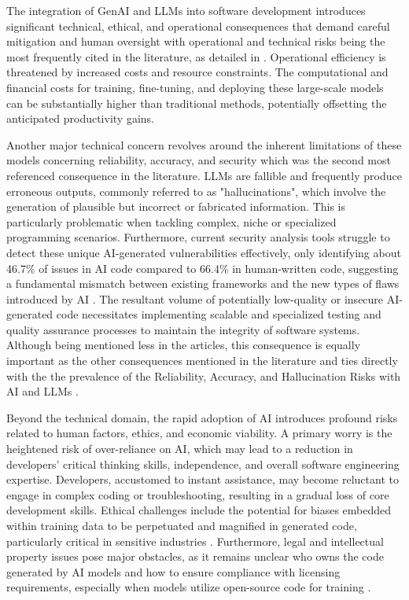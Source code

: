 The integration of GenAI and LLMs into software development introduces significant technical, ethical, and operational consequences that demand careful mitigation and human oversight with operational and technical risks being the most frequently cited in the literature, as detailed in . Operational efficiency is threatened by increased costs and resource constraints. The computational and financial costs for training, fine-tuning, and deploying these large-scale models can be substantially higher than traditional methods, potentially offsetting the anticipated productivity gains. 

Another major technical concern revolves around the inherent limitations of these models concerning reliability, accuracy, and security which was the second most referenced consequence in the literature. LLMs are fallible and frequently produce erroneous outputs, commonly referred to as "hallucinations", which involve the generation of plausible but incorrect or fabricated information. This is particularly problematic when tackling complex, niche or specialized programming scenarios. Furthermore, current security analysis tools struggle to detect these unique AI-generated vulnerabilities effectively, only identifying about 46.7\% of issues in AI code compared to 66.4\% in human-written code, suggesting a fundamental mismatch between existing frameworks and the new types of flaws introduced by AI \cite{Yoo:2025sa}. The resultant volume of potentially low-quality or insecure AI-generated code necessitates implementing scalable and specialized testing and quality assurance processes to maintain the integrity of software systems. Although being mentioned less in the articles, this consequence is equally important as the other consequences mentioned in the literature and ties directly with the the prevalence of the Reliability, Accuracy, and Hallucination Risks with AI and LLMs . 

Beyond the technical domain, the rapid adoption of AI introduces profound risks related to human factors, ethics, and economic viability. A primary worry is the heightened risk of over-reliance on AI, which may lead to a reduction in developers' critical thinking skills, independence, and overall software engineering expertise. Developers, accustomed to instant assistance, may become reluctant to engage in complex coding or troubleshooting, resulting in a gradual loss of core development skills. Ethical challenges include the potential for biases embedded within training data to be perpetuated and magnified in generated code, particularly critical in sensitive industries \cite{Haque:2025la}. Furthermore, legal and intellectual property issues pose major obstacles, as it remains unclear who owns the code generated by AI models and how to ensure compliance with licensing requirements, especially when models utilize open-source code for training \cite{Terragni:2025fa}. 


